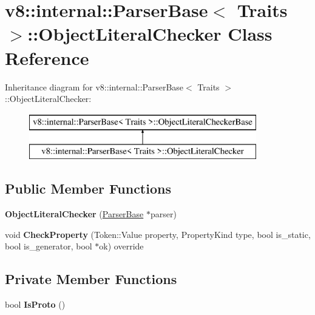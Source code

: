 \hypertarget{classv8_1_1internal_1_1_parser_base_1_1_object_literal_checker}{}\section{v8\+:\+:internal\+:\+:Parser\+Base$<$ Traits $>$\+:\+:Object\+Literal\+Checker Class Reference}
\label{classv8_1_1internal_1_1_parser_base_1_1_object_literal_checker}
Inheritance diagram for v8\+:\+:internal\+:\+:Parser\+Base$<$ Traits $>$\+:\+:Object\+Literal\+Checker\+:\begin{figure}[H]
\begin{center}
\leavevmode
\includegraphics[height=2.000000cm]{classv8_1_1internal_1_1_parser_base_1_1_object_literal_checker}
\end{center}
\end{figure}
\subsection*{Public Member Functions}
\begin{DoxyCompactItemize}
\item 
{\bfseries Object\+Literal\+Checker} (\hyperlink{classv8_1_1internal_1_1_parser_base}{Parser\+Base} $\ast$parser)\hypertarget{classv8_1_1internal_1_1_parser_base_1_1_object_literal_checker_a5daf6996df4ecc76512a2c05b543393c}{}\label{classv8_1_1internal_1_1_parser_base_1_1_object_literal_checker_a5daf6996df4ecc76512a2c05b543393c}

\item 
void {\bfseries Check\+Property} (Token\+::\+Value property, Property\+Kind type, bool is\+\_\+static, bool is\+\_\+generator, bool $\ast$ok) override\hypertarget{classv8_1_1internal_1_1_parser_base_1_1_object_literal_checker_a33e7f5c39b0949edaffcc1ee031d8e35}{}\label{classv8_1_1internal_1_1_parser_base_1_1_object_literal_checker_a33e7f5c39b0949edaffcc1ee031d8e35}

\end{DoxyCompactItemize}
\subsection*{Private Member Functions}
\begin{DoxyCompactItemize}
\item 
bool {\bfseries Is\+Proto} ()\hypertarget{classv8_1_1internal_1_1_parser_base_1_1_object_literal_checker_a50d1d824994dc86d86bb0968f663fe44}{}\label{classv8_1_1internal_1_1_parser_base_1_1_object_literal_checker_a50d1d824994dc86d86bb0968f663fe44}

\end{DoxyCompactItemize}
